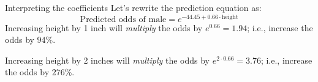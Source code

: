 \documentclass{beamer}\usepackage[]{graphicx}\usepackage[]{color}
\begin{document}
\begin{darkframes}
    \begin{frame}{Interpreting the coefficients}
      Let's rewrite the prediction equation as:
      \[
        \text{Predicted odds of male} = e^{-44.45 + 0.66\cdot\text{height}}
      \]
      Increasing height by 1 inch will \emph{multiply} the odds by $e^{0.66}=1.94$; i.e., increase the odds by $94$\%.

      \bigskip\pause
      Increasing height by 2 inches will \emph{multiply} the odds by $e^{2 \cdot 0.66}=3.76$; i.e., increase the odds by $276$\%.
    \end{frame}
  \end{darkframes}
\end{document}
